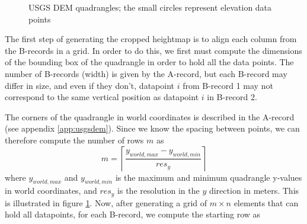 \begin{figure}[ht]
\centering
{}
\qquad
{}
\caption{USGS DEM quadrangles; the small circles represent elevation data points}
\label{fig:dem_quadrangle}
\end{figure}

The first step of generating the cropped heightmap is to align each column from the B-records in a grid. In order to do this, we first must compute the dimensions of the bounding box of the quadrangle in order to hold all the data points. The number of B-records (width) is given by the A-record, but each B-record may differ in size, and even if they don't, datapoint $i$ from B-record 1 may not correspond to the same vertical position as datapoint $i$ in B-record 2. 

The corners of the quadrangle in world coordinates is described in the A-record (see appendix \ref{app:usgsdem}). Since we know the spacing between points, we can therefore compute the number of rows $m$ as
$$
m = \left\lceil\frac{y_{world,max}-y_{world,min}}{res_y}\right\rceil
$$
where $y_{world,max}$ and $y_{world,min}$ is the maximum and minimum quadrangle y-values in world coordinates, and $res_y$ is the resolution in the $y$ direction in meters. This is illustrated in figure \ref{fig:dem_quadrangle}. Now, after generating a grid of $m\times n$ elements that can hold all datapoints, for each B-record, we compute the starting row as

